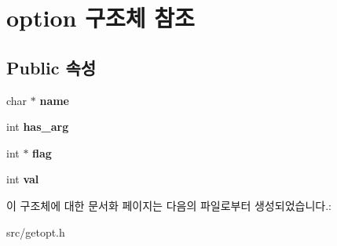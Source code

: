 \hypertarget{structoption}{}\section{option 구조체 참조}
\label{structoption}
\subsection*{Public 속성}
\begin{DoxyCompactItemize}
\item 
\mbox{\label{structoption_a92c850a23c7828c1dba453bf8d15e1f0}} 
char $\ast$ {\bfseries name}
\item 
\mbox{\label{structoption_a90d7ee9a51eea5c002682dbd0af149e4}} 
int {\bfseries has\+\_\+arg}
\item 
\mbox{\label{structoption_ab366eea5fe7be25c1928328ba715e353}} 
int $\ast$ {\bfseries flag}
\item 
\mbox{\label{structoption_a13bd155ec3b405d29c41ab8d0793be11}} 
int {\bfseries val}
\end{DoxyCompactItemize}


이 구조체에 대한 문서화 페이지는 다음의 파일로부터 생성되었습니다.\+:\begin{DoxyCompactItemize}
\item 
src/getopt.\+h\end{DoxyCompactItemize}
